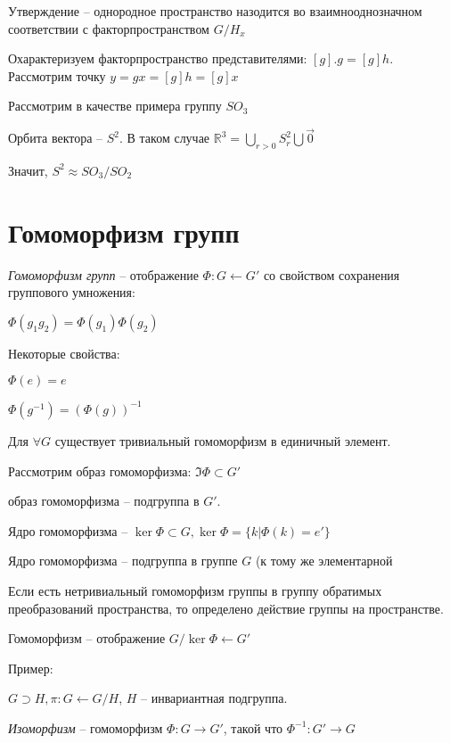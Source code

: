\documentclass[10pt,a4paper]{article}
\begin{document}
		Утверждение -- однородное пространство назодится во взаимнооднозначном соответствии с факторпространством $G/H_{x}$
		
		Охарактеризуем факторпространство представителями: $\left[g\right]. g = \left[g\right]h$. Рассмотрим точку $y = gx = \left[g\right]h = \left[g\right]x$   
		
		Рассмотрим в качестве примера группу $SO_{3}$  
		
		Орбита вектора -- $S^2$. В таком случае $\mathbb{R}^{3} =\bigcup\limits_{r > 0} S^{2}_{r} \bigcup {\vec{0}}$
		
		Значит, $S^{2} \approx SO_{3}/SO_{2}$
		
		\section{Гомоморфизм групп}
		
		\textit{Гомоморфизм групп} -- отображение $\Phi : G\leftarrow G'$ со свойством сохранения группового умножения:
		
		$\Phi\left(g_{1}g_{2}\right) = \Phi\left(g_{1}\right)\Phi\left(g_{2}\right)$
		
		Некоторые свойства:
		
		$\Phi\left(e\right) = e$
		
		$\Phi\left(g^{-1}\right) = \left(\Phi\left(g\right)\right)^{-1}$
		
		Для $\forall G$ существует тривиальный гомоморфизм в единичный элемент.
		
		Рассмотрим образ гомоморфизма: $\Im \Phi \subset G'$ 
		
		образ гомоморфизма -- подгруппа в $G'$. 
		
		Ядро гомоморфизма -- $\ker \Phi \subset G, \ker \Phi = \lbrace k | \Phi\left(k\right) = e'\rbrace$
		
		Ядро гомоморфизма -- подгруппа в группе $G$ (к тому же элементарной
		
		Если есть нетривиальный гомоморфизм группы в группу обратимых преобразований пространства, то определено действие группы на пространстве.
		
		Гомоморфизм -- отображение $G\slash\ker \Phi \leftarrow G'$
		
		Пример:
		
		$G \supset H, \pi: G \leftarrow G\slash H$, $H$ -- инвариантная подгруппа.
		
		
		\textit{Изоморфизм} -- гомоморфизм $\Phi: G \rightarrow G'$, такой что $\Phi^{-1}: G' \rightarrow G$
\end{document}
